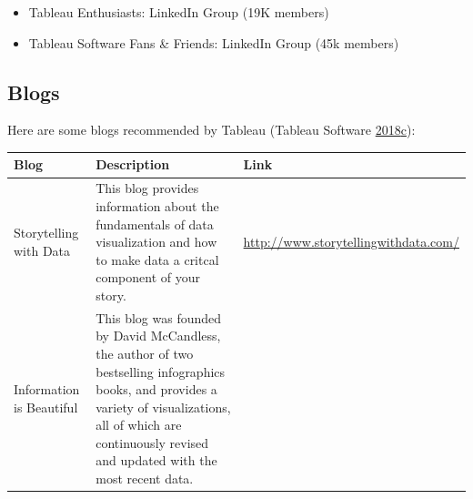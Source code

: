 \documentclass[]{book}
\providecommand{\tightlist}{%
  \setlength{\itemsep}{0pt}\setlength{\parskip}{0pt}}
\begin{document}
\begin{itemize}
\tightlist
\item
  Tableau Enthusiasts: LinkedIn Group (19K members)
\item
  Tableau Software Fans \& Friends: LinkedIn Group (45k members)
\end{itemize}

\hypertarget{blogs}{%
\subsection{Blogs}\label{blogs}}

Here are some blogs recommended by Tableau (Tableau Software \protect\hyperlink{ref-Top_10_Blogs}{2018}\protect\hyperlink{ref-Top_10_Blogs}{c}):

\begin{longtable}[]{@{}lll@{}}
\toprule
\begin{minipage}[b]{0.24\columnwidth}\raggedright
\textbf{Blog}\strut
\end{minipage} & \begin{minipage}[b]{0.44\columnwidth}\raggedright
\textbf{Description}\strut
\end{minipage} & \begin{minipage}[b]{0.24\columnwidth}\raggedright
\textbf{Link}\strut
\end{minipage}\tabularnewline
\midrule
\endhead
\begin{minipage}[t]{0.24\columnwidth}\raggedright
Storytelling with Data\strut
\end{minipage} & \begin{minipage}[t]{0.44\columnwidth}\raggedright
This blog provides information about the fundamentals of data visualization and how to make data a critcal component of your story.\strut
\end{minipage} & \begin{minipage}[t]{0.24\columnwidth}\raggedright
\url{http://www.storytellingwithdata.com/}\strut
\end{minipage}\tabularnewline
\begin{minipage}[t]{0.24\columnwidth}\raggedright
Information is Beautiful\strut
\end{minipage} & \begin{minipage}[t]{0.44\columnwidth}\raggedright
This blog was founded by David McCandless, the author of two bestselling infographics books, and provides a variety of visualizations, all of which are continuously revised and updated with the most recent data.\strut
\end{minipage} & \begin{minipage}[t]{0.24\columnwidth}\raggedright

\end{minipage}
\end{longtable}
\end{document}
